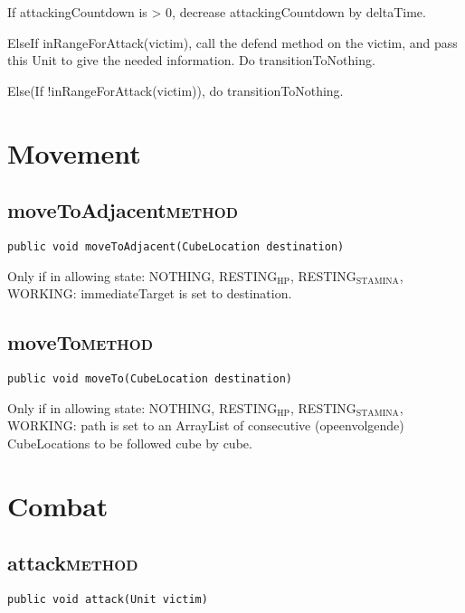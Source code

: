 \documentclass[11pt]{article}
\begin{document}
If attackingCountdown is > 0, decrease attackingCountdown by deltaTime.

ElseIf inRangeForAttack(victim), call the defend method on the victim, and pass
this Unit to give the needed information. Do transitionToNothing.

Else(If !inRangeForAttack(victim)), do transitionToNothing.


\section{Movement}
\label{sec-3}

\subsection{moveToAdjacent\hfill{}\textsc{method}}
\label{sec-3-1}

\begin{verbatim}
public void moveToAdjacent(CubeLocation destination)
\end{verbatim}

Only if in allowing state: NOTHING, RESTING$_{\text{HP}}$, RESTING$_{\text{STAMINA}}$, WORKING:
immediateTarget is set to destination.


\subsection{moveTo\hfill{}\textsc{method}}
\label{sec-3-2}

\begin{verbatim}
public void moveTo(CubeLocation destination)
\end{verbatim}

Only if in allowing state: NOTHING, RESTING$_{\text{HP}}$, RESTING$_{\text{STAMINA}}$, WORKING:
path is set to an ArrayList of consecutive (opeenvolgende) CubeLocations to be
followed cube by cube.


\section{Combat}
\label{sec-4}

\subsection{attack\hfill{}\textsc{method}}
\label{sec-4-1}

\begin{verbatim}
public void attack(Unit victim)
\end{verbatim}
\end{document}
